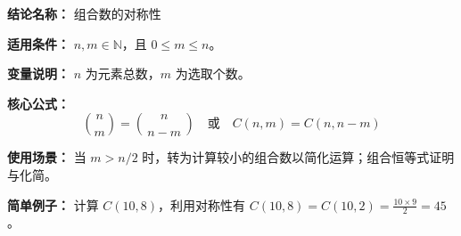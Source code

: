\textbf{结论名称：} 组合数的对称性

\textbf{适用条件：} \(n,m\in\mathbb{N}\)，且 \(0 \leq m \leq n\)。

\textbf{变量说明：} \(n\) 为元素总数，\(m\) 为选取个数。

\textbf{核心公式：} \[ \boxed{\binom{n}{m} = \binom{n}{\,n-m\,}} \quad \text{或} \quad \boxed{C(n,m)=C(n,n-m)} \]

\textbf{使用场景：} 当 \(m > n/2\) 时，转为计算较小的组合数以简化运算；组合恒等式证明与化简。

\textbf{简单例子：} 计算 \(C(10,8)\)，利用对称性有 \(C(10,8)=C(10,2)=\frac{10\times 9}{2}=45\)。
